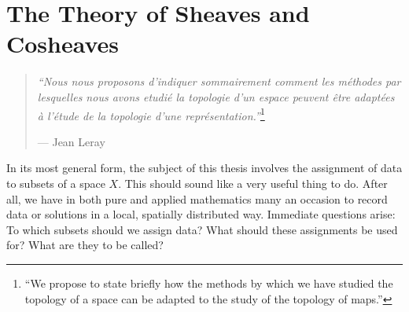 

%
%

\chapter{The Theory of Sheaves and Cosheaves}
\label{sec:abstract_sheaves}

\begin{quote}
{\em ``Nous nous proposons d'indiquer sommairement comment les m\'ethodes par lesquelles nous avons etudi\'e la topologie d'un espace peuvent \^{e}tre adapt\'ees \`a l'\'etude de la topologie d'une repr\'esentation.''}\footnote{``We propose to state briefly how the methods by which we have studied the topology of a space can be adapted to the study of the topology of maps.''}
\begin{flushright} --- Jean Leray~\cite{leray46representation} \end{flushright}
\end{quote}

In its most general form, the subject of this thesis involves the assignment of data to subsets of a space $X$. This should sound like a very useful thing to do. After all, we have in both pure and applied mathematics many an occasion to record data or solutions in a local, spatially distributed way. Immediate questions arise: To which subsets should we assign data? What should these assignments be used for? What are they to be called?

